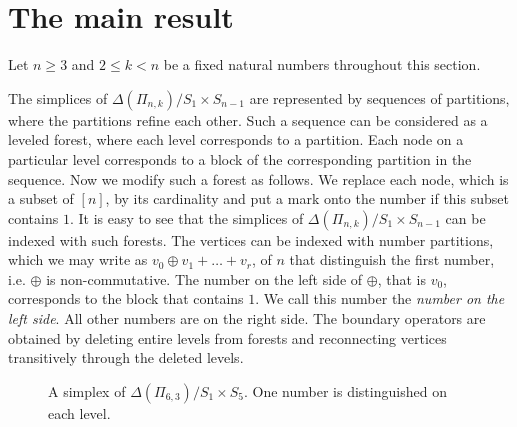 \documentclass{elsarticle}
\begin{document}
\section{The main result}
Let $n\geq 3$ and $2\leq k<n$ be a fixed natural numbers throughout this section.

The simplices of $\Delta(\Pi_{n,k})/S_1\times S_{n-1}$ are represented by sequences of partitions, where the partitions refine each other. Such a sequence can be considered as a leveled forest, where each level corresponds to a partition. Each node on a particular level corresponds to a block of the corresponding partition in the sequence. Now we modify such a forest as follows. We replace each node, which is a subset of $[n]$, by its cardinality and put a mark onto the number if this subset contains $1$. It is easy to see that the simplices of $\Delta(\Pi_{n,k})/S_1\times S_{n-1}$ can be indexed with such forests. The vertices can be indexed with number partitions, which we may write as $v_0\oplus v_1+\dots+v_r$, of $n$ that distinguish the first number, i.e. $\oplus$ is non-commutative. The number on the left side of $\oplus$, that is $v_0$, corresponds to the block that contains $1$. We call this number the \emph{number on the left side}. All other numbers are on the right side. The boundary operators are obtained by deleting entire levels from forests and reconnecting vertices transitively through the deleted levels.
\begin{figure}[ht]
\centering
 
\caption{A simplex of $\Delta(\Pi_{6,3})/S_1\times S_5$. One number is distinguished on each level.}
\end{figure}
\end{document}
